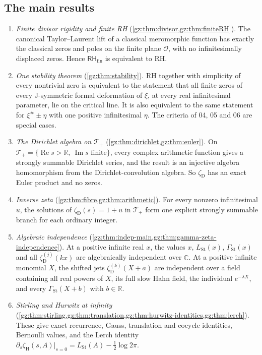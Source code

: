 \documentclass[11pt,a4paper]{article}
\numberwithin{equation}{section}
\theoremstyle{definition}
\theoremstyle{remark}
\newcommand{\R}{\mathbb R}
\newcommand{\C}{\mathbb C}
\newcommand{\OO}{\mathcal O}
\renewcommand{\Re}{\operatorname{Re}}
\renewcommand{\Im}{\operatorname{Im}}
\newcommand{\RH}{\mathsf{RH}}
\newcommand{\LSt}{L_{\mathrm{St}}}
\newcommand{\GSt}{\Gamma_{\mathrm{St}}}
\newcommand{\zD}{\zeta_{\mathrm D}}
\newcommand{\zH}{\zeta_{\mathrm H}}
\newcommand{\xip}{\xi^{\#}}
\newcommand{\Tp}{\mathcal T_{+}}
\begin{document}
\subsection{The main results}\label{gz:sec:main}
\begin{enumerate}[label=(\arabic*),leftmargin=2.2em]
\item \emph{Finite divisor rigidity and finite RH}
 (\cref{gz:thm:divisor,gz:thm:finiteRH}). The canonical Taylor--Laurent
 lift of a classical meromorphic function has exactly the classical zeros
 and poles on the finite plane $\OO$, with no infinitesimally displaced
 zeros. Hence $\RH_{\mathrm{fin}}$ is equivalent to RH.
\item \emph{One stability theorem} (\cref{gz:thm:stability}). RH together
 with simplicity of every nontrivial zero is equivalent to the statement
 that all finite zeros of every J-symmetric formal deformation of $\xi$, at
 every real infinitesimal parameter, lie on the critical line. It is also
 equivalent to the same statement for $\xip\pm\eta$ with one positive
 infinitesimal $\eta$. The criteria of 04, 05 and 06 are special cases.
\item \emph{The Dirichlet algebra on $\Tp$} (\cref{gz:thm:dirichlet,gz:thm:euler}).
 On $\Tp=\{\Re s>\R,\ \Im s\text{ finite}\}$, every complex arithmetic
 function gives a strongly summable Dirichlet series, and the result is an
 injective algebra homomorphism from the Dirichlet-convolution algebra. So
 $\zD$ has an exact Euler product and no zeros.
\item \emph{Inverse zeta} (\cref{gz:thm:fibre,gz:thm:arithmetic}). For
 every nonzero infinitesimal $u$, the solutions of $\zD(s)=1+u$ in $\Tp$
 form one explicit strongly summable branch for each ordinary integer.
\item \emph{Algebraic independence} (\cref{gz:thm:indep-main,gz:thm:gamma-zeta-independence}).
 At a positive infinite real $x$, the values $x$, $\LSt(x)$, $\GSt(x)$ and
 all $\zD^{(j)}(kx)$ are algebraically independent over $\C$. At a positive
 infinite monomial $X$, the shifted jets $\zD^{(k)}(X+a)$ are independent
 over a field containing all real powers of $X$, its full slow Hahn field,
 the individual $e^{-\lambda X}$, and every $\GSt(X+b)$ with $b\in\R$.
\item \emph{Stirling and Hurwitz at infinity}
 (\cref{gz:thm:stirling,gz:thm:translation,gz:thm:hurwitz-identities,gz:thm:lerch}).
 These give exact recurrence, Gauss, translation and cocycle identities,
 Bernoulli values, and the Lerch identity
 $\partial_s\zH(s,A)|_{s=0}=\LSt(A)-\tfrac12\log2\pi$.

\end{enumerate}
\end{document}
